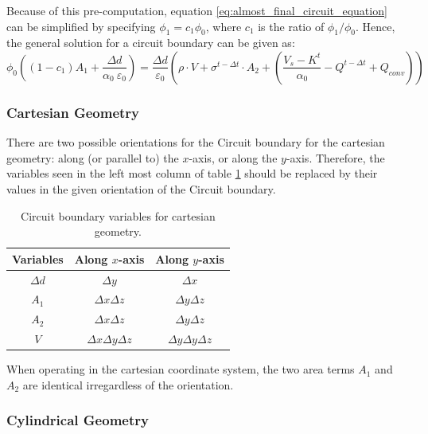 Because of this pre-computation, equation \ref{eq:almost_final_circuit_equation} can be simplified by specifying $\phi_1 = c_1 \phi_0$, where $c_1$ is the ratio of $\phi_1/\phi_0$. Hence, the general solution for a circuit boundary can be given as:
\begin{equation}
	\phi_0 \left((1 - c_1)A_1 + \frac{\Delta d}{\alpha_0 \ \varepsilon_0} \right) = \frac{\Delta d}{\varepsilon_0} \left(\rho \cdot V + \sigma^{t - \Delta t} \cdot A_2 + \left(\frac{V_s - K^t}{\alpha_0} - Q^{t - \Delta t} + Q_{conv} \right) \right)
	\label{eq:final_circuit_equation}
\end{equation}


\subsubsection{Cartesian Geometry}

There are two possible orientations for the Circuit boundary for the cartesian geometry: along (or parallel to) the $x$-axis, or along the $y$-axis. Therefore, the variables seen in the left most column of table \ref{tb:variables_cartesian_geometry} should be replaced by their values in the given orientation of the Circuit boundary.

\begin{table}[h!]
	\caption{Circuit boundary variables for cartesian geometry.}
	\vspace{5 pt}
	\centering
	\begin{tabular}{c c c}
		Variables  & Along $x$-axis      		   & Along $y$-axis       \\
		\hline 
		$\Delta d$ & $\Delta y$           		   & $\Delta x$           \\
		$A_1$      & $\Delta x \Delta z$  		   & $\Delta y \Delta z$  \\
		$A_2$      & $\Delta x \Delta z$           & $\Delta y \Delta z$  \\
		$V$        & $\Delta x \Delta y \Delta z$  & $\Delta y \Delta y  \Delta z$
	\end{tabular}
	\label{tb:variables_cartesian_geometry}
\end{table}

When operating in the cartesian coordinate system, the two area terms $A_1$ and $A_2$ are identical irregardless of the orientation. 

\subsubsection{Cylindrical Geometry}

